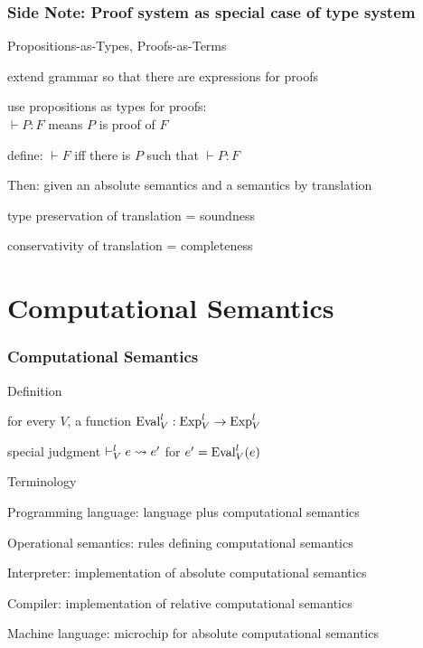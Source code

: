 \begin{frame}\frametitle{Side Note: Proof system as special case of type system}
\begin{blockitems}{Propositions-as-Types, Proofs-as-Terms}
\item extend grammar so that there are expressions for proofs
\item use propositions as types for proofs:\\
 $\vdash P:F$ means $P$ is proof of $F$
\item define: $\vdash F$ iff there is $P$ such that $\vdash P:F$
\end{blockitems}

\begin{blockitems}{Then: given an absolute semantics and a semantics by translation}
 \item type preservation of translation = soundness
 \item conservativity of translation = completeness
\end{blockitems}
\end{frame}

\section{Computational Semantics}

\begin{frame}\frametitle{Computational Semantics}
\begin{blockitems}{Definition}
\item for every $V$, a function $\mathrm{Eval}^l_V:\mathrm{Exp}^l_V\to\mathrm{Exp}^l_V$
\item special judgment $\vdash^l_V e\rightsquigarrow e'$ for $e'=\mathrm{Eval}^l_V(e)$
\end{blockitems}

\begin{blockitems}{Terminology}
\item Programming language: language plus computational semantics
\item Operational semantics: rules defining computational semantics
\item Interpreter: implementation of absolute computational semantics
\item Compiler: implementation of relative computational semantics
\item Machine language: microchip for absolute computational semantics
\end{blockitems}
\end{frame}

